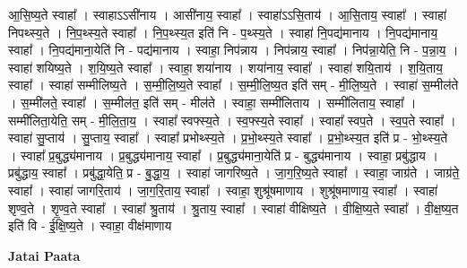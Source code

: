 \documentclass[17pt]{extarticle}
\begin{document}
आ॒सि॒ष्य॒ते स्वाहा᳚ । स्वाहाऽऽसी॑नाय । आसी॑नाय॒ स्वाहा᳚ । स्वाहा॑ऽऽसि॒ताय॑ । आ॒सि॒ताय॒ स्वाहा᳚ । स्वाहा॑ निपथ्स्य॒ते । नि॒प॒थ्स्य॒ते स्वाहा᳚ । नि॒प॒थ्स्य॒त इति॑ नि - प॒थ्स्य॒ते । स्वाहा॑ नि॒पद्य॑मानाय । नि॒पद्य॑मानाय॒ स्वाहा᳚ । नि॒पद्य॑माना॒येति॑ नि - पद्य॑मानाय । स्वाहा॒ निप॑न्नाय । निप॑न्नाय॒ स्वाहा᳚ । निप॑न्ना॒येति॒ नि - प॒न्ना॒य॒ । स्वाहा॑ शयिष्य॒ते । श॒यि॒ष्य॒ते स्वाहा᳚ । स्वाहा॒ शया॑नाय । शया॑नाय॒ स्वाहा᳚ । स्वाहा॑ शयि॒ताय॑ । श॒यि॒ताय॒ स्वाहा᳚ । स्वाहा॑ सम्मीलिष्य॒ते । स॒म्मी॒लि॒ष्य॒ते स्वाहा᳚ । स॒म्मी॒लि॒ष्य॒त इति॑ सम् - मी॒लि॒ष्य॒ते । स्वाहा॑ स॒म्मील॑ते । स॒म्मी॑लते॒ स्वाहा᳚ । स॒म्मील॑त॒ इति॑ सम् - मील॑ते । स्वाहा॒ सम्मी॑लिताय । सम्मी॑लिताय॒ स्वाहा᳚ । सम्मी॑लिता॒येति॒ सम् - मी॒लि॒ता॒य॒ । स्वाहा᳚ स्वफ्स्य॒ते । स्व॒फ्स्य॒ते स्वाहा᳚ । स्वाहा᳚ स्वप॒ते । स्व॒प॒ते स्वाहा᳚ । स्वाहा॑ सु॒प्ताय॑ । सु॒प्ताय॒ स्वाहा᳚ । स्वाहा᳚ प्रभोथ्स्य॒ते । प्र॒भो॒थ्स्य॒ते स्वाहा᳚ । प्र॒भो॒थ्स्य॒त इति॑ प्र - भो॒थ्स्य॒ते । स्वाहा᳚ प्र॒बुद्ध्य॑मानाय । प्र॒बुद्ध्य॑मानाय॒ स्वाहा᳚ । प्र॒बुद्ध्य॑माना॒येति॑ प्र - बुद्ध्य॑मानाय । स्वाहा॒ प्रबु॑द्धाय । प्रबु॑द्धाय॒ स्वाहा᳚ । प्रबु॑द्धा॒येति॒ प्र - बु॒द्धा॒य॒ । स्वाहा॑ जागरिष्य॒ते । जा॒ग॒रि॒ष्य॒ते स्वाहा᳚ । स्वाहा॒ जाग्र॑ते । जाग्र॑ते॒ स्वाहा᳚ । स्वाहा॑ जागरि॒ताय॑ । जा॒ग॒रि॒ताय॒ स्वाहा᳚ । स्वाहा॒ शुश्रू॑षमाणाय । शुश्रू॑षमाणाय॒ स्वाहा᳚ । स्वाहा॑ शृण्व॒ते । शृ॒ण्व॒ते स्वाहा᳚ । स्वाहा᳚ श्रु॒ताय॑ । श्रु॒ताय॒ स्वाहा᳚ । स्वाहा॑ वीक्षिष्य॒ते । वी॒क्षि॒ष्य॒ते स्वाहा᳚ । वी॒क्ष॒ष्य॒त इति॑ वि - ई॒क्षि॒ष्य॒ते । स्वाहा॒ वीक्ष॑माणाय \newline

\textbf{Jatai Paata} \newline
\end{document}
